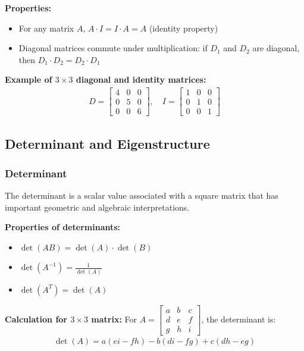 \documentclass{article}
\begin{document}
\textbf{Properties:}
\begin{itemize}
    \item For any matrix $A$, $A \cdot I = I \cdot A = A$ (identity property)
    \item Diagonal matrices commute under multiplication: if $D_1$ and $D_2$ are diagonal, then $D_1 \cdot D_2 = D_2 \cdot D_1$
\end{itemize}

\textbf{Example of $3 \times 3$ diagonal and identity matrices:}
\begin{align}
D = \begin{bmatrix} 
4 & 0 & 0 \\
0 & 5 & 0 \\
0 & 0 & 6
\end{bmatrix}, \quad 
I = \begin{bmatrix} 
1 & 0 & 0 \\
0 & 1 & 0 \\
0 & 0 & 1
\end{bmatrix}
\end{align}

\subsection{Determinant and Eigenstructure}

\subsubsection{Determinant}
The determinant is a scalar value associated with a square matrix that has important geometric and algebraic interpretations.

\textbf{Properties of determinants:}
\begin{itemize}
    \item $\det(AB) = \det(A) \cdot \det(B)$
    \item $\det(A^{-1}) = \frac{1}{\det(A)}$
    \item $\det(A^T) = \det(A)$
\end{itemize}

\textbf{Calculation for $3 \times 3$ matrix:}
For $A = \begin{bmatrix} a & b & c \\ d & e & f \\ g & h & i \end{bmatrix}$, the determinant is:
\begin{align}
\det(A) = a(ei - fh) - b(di - fg) + c(dh - eg)
\end{align}
\end{document}
